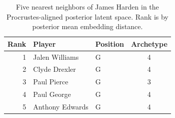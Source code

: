 \begin{table}[htbp]
  \centering\small
  \begin{tabular}{rllc}
    \toprule
    Rank & Player & Position & Archetype \\
    \midrule
    1 & Jalen Williams & G & 4 \\
    2 & Clyde Drexler & G & 4 \\
    3 & Paul Pierce & G & 3 \\
    4 & Paul George & G & 4 \\
    5 & Anthony Edwards & G & 4 \\
    \bottomrule
  \end{tabular}
  \caption{Five nearest neighbors of James Harden in the Procrustes-aligned posterior latent space. Rank is by posterior mean embedding distance.}
  \label{tab:James_Harden_neighbors}
\end{table}

